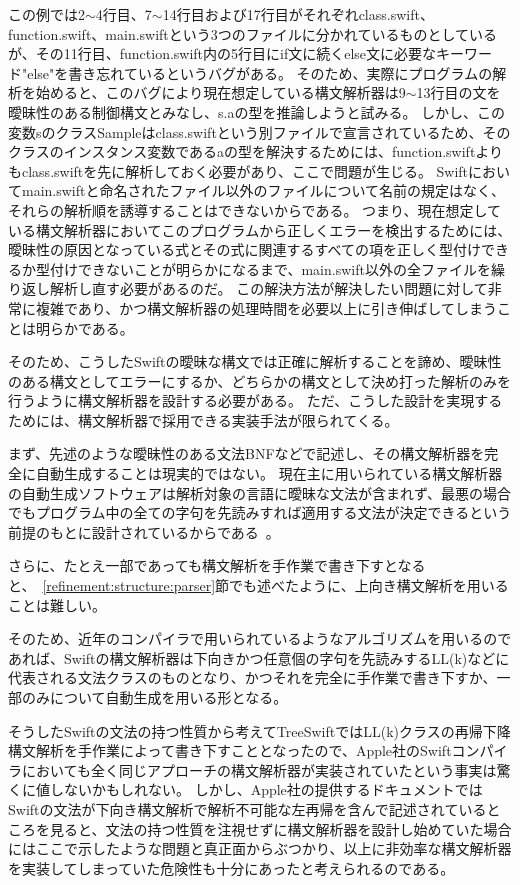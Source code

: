 この例では2$\sim$4行目、7$\sim$14行目および17行目がそれぞれclass.swift、function.swift、main.swiftという3つのファイルに分かれているものとしているが、その11行目、function.swift内の5行目にif文に続くelse文に必要なキーワード"else"を書き忘れているというバグがある。
そのため、実際にプログラムの解析を始めると、このバグにより現在想定している構文解析器は9$\sim$13行目の文を曖昧性のある制御構文とみなし、s.aの型を推論しようと試みる。
しかし、この変数sのクラスSampleはclass.swiftという別ファイルで宣言されているため、そのクラスのインスタンス変数であるaの型を解決するためには、function.swiftよりもclass.swiftを先に解析しておく必要があり、ここで問題が生じる。
Swiftにおいてmain.swiftと命名されたファイル以外のファイルについて名前の規定はなく、それらの解析順を誘導することはできないからである。
つまり、現在想定している構文解析器においてこのプログラムから正しくエラーを検出するためには、曖昧性の原因となっている式とその式に関連するすべての項を正しく型付けできるか型付けできないことが明らかになるまで、main.swift以外の全ファイルを繰り返し解析し直す必要があるのだ。
この解決方法が解決したい問題に対して非常に複雑であり、かつ構文解析器の処理時間を必要以上に引き伸ばしてしまうことは明らかである。

そのため、こうしたSwiftの曖昧な構文では正確に解析することを諦め、曖昧性のある構文としてエラーにするか、どちらかの構文として決め打った解析のみを行うように構文解析器を設計する必要がある。
ただ、こうした設計を実現するためには、構文解析器で採用できる実装手法が限られてくる。

まず、先述のような曖昧性のある文法BNFなどで記述し、その構文解析器を完全に自動生成することは現実的ではない。
現在主に用いられている構文解析器の自動生成ソフトウェアは解析対象の言語に曖昧な文法が含まれず、最悪の場合でもプログラム中の全ての字句を先読みすれば適用する文法が決定できるという前提のもとに設計されているからである~\cite{antlr}。

さらに、たとえ一部であっても構文解析を手作業で書き下すとなると、~\ref{refinement:structure:parser}節でも述べたように、上向き構文解析を用いることは難しい。

そのため、近年のコンパイラで用いられているようなアルゴリズムを用いるのであれば、Swiftの構文解析器は下向きかつ任意個の字句を先読みするLL(k)などに代表される文法クラスのものとなり、かつそれを完全に手作業で書き下すか、一部のみについて自動生成を用いる形となる。

そうしたSwiftの文法の持つ性質から考えてTreeSwiftではLL(k)クラスの再帰下降構文解析を手作業によって書き下すこととなったので、Apple社のSwiftコンパイラにおいても全く同じアプローチの構文解析器が実装されていたという事実は驚くに値しないかもしれない。
しかし、Apple社の提供するドキュメントではSwiftの文法が下向き構文解析で解析不可能な左再帰を含んで記述されているところを見ると、文法の持つ性質を注視せずに構文解析器を設計し始めていた場合にはここで示したような問題と真正面からぶつかり、以上に非効率な構文解析器を実装してしまっていた危険性も十分にあったと考えられるのである。

